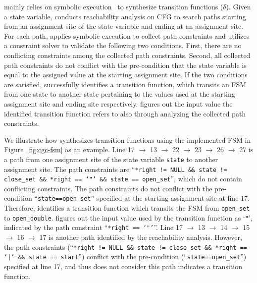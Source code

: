 \Tool{} mainly relies on symbolic execution~\cite{klee,s2e} 
to synthesize transition functions ($\delta$).  
Given a state variable,
\Tool{} conducts reachability analysis on CFG to search paths starting 
from an assignment site of the state variable 
and ending at an assignment site. 
For each path, \Tool{} applies symbolic execution to 
collect path constraints and utilizes a constraint solver to validate 
the following two conditions. 
First, there are no conflicting constraints among the collected path constraints. 
Second, all collected path constraints do not conflict with the pre-condition
that the state variable is equal to the assigned value at the starting assignment site. 
If the two conditions are satisfied, 
\Tool{} successfully identifies a transition function, 
which transits an FSM from one state to another state pertaining to 
the values used at the starting assignment 
site and ending site respectively. 
\Tool{} figures out the input value the identified 
transition function refers to 
also through analyzing the collected path constraints. 



We illustrate how \Tool{} synthesizes transition functions using 
the implemented FSM in Figure~\ref{fig:cgc-fsm} as an example. 
Line 17 $\rightarrow$ 13 $\rightarrow$ 22 $\rightarrow$ 23 $\rightarrow$ 26 $\rightarrow$ 27
is a path from one assignment site of the state variable \texttt{state} 
to another assignment site. 
The path constraints are 
``\texttt{*right != NULL \&\& state != close\_set \&\& *right == `"' \&\& state == open\_set}'', 
which do not contain conflicting constraints. 
The path constraints do not conflict with the pre-condition ``\texttt{state==open\_set}'' 
specified at the starting assignment site at line 17.
Therefore, \Tool{} identifies a transition function which transits the FSM from  
\texttt{open\_set} to \texttt{open\_double}. 
\Tool{} figures out the input value used by the 
transition function as `\texttt{"}', 
indicated by the path 
constraint ``\texttt{*right == `"'}''.  
Line 17 $\rightarrow$ 13 $\rightarrow$ 14 $\rightarrow$ 15 
$\rightarrow$ 16 $\rightarrow$ 17
is another path identified by the reachability analysis. 
However, the path constraints (``\texttt{*right != NULL \&\& state != close\_set \&\& *right == `|' \&\& state == start}'') 
conflict 
with the pre-condition (``\texttt{state==open\_set}'') specified at line 17, 
and thus \Tool{} does not consider 
this path indicates a transition function. 




